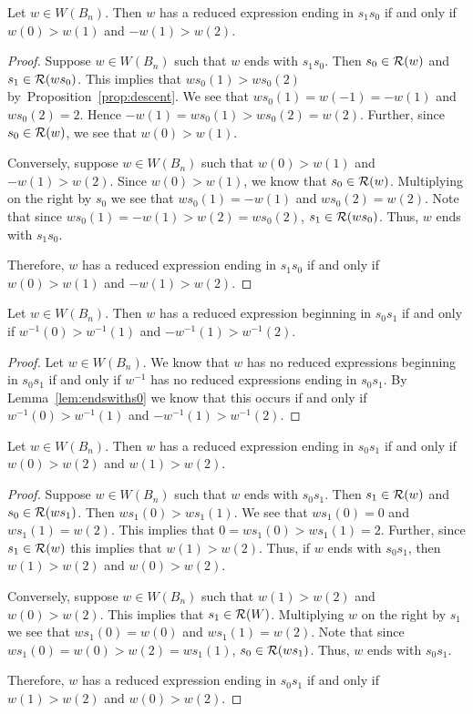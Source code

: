 \begin{lemma}\label{lem:endswiths0}
Let $w \in W(B_n)$. Then $w$ has a reduced expression ending in $s_1s_0$ if and only if $w(0)>w(1)$ and $-w(1)>w(2)$.
\begin{proof}
	Suppose $w \in W(B_n)$ such that $w$ ends with $s_1s_0$. Then $s_0 \in \mathcal{R}(w)$ and $s_1 \in \mathcal{R}(ws_0)$. This implies that $ws_0(1)>ws_0(2)$ by~Proposition~\ref{prop:descent}. We see that $ws_0(1)=w(-1)=-w(1)$ and $ws_0(2)=2$. Hence $-w(1)=ws_0(1)>ws_0(2)=w(2)$. Further, since $s_0 \in \mathcal{R}(w)$, we see that $w(0)>w(1)$.
	
	Conversely, suppose $w \in W(B_n)$ such that $w(0)>w(1)$ and $-w(1)>w(2)$. Since $w(0)>w(1)$, we know that $s_0 \in \mathcal{R}(w)$. Multiplying on the right by $s_0$ we see that $ws_0(1)=-w(1)$ and $ws_0(2)=w(2)$. Note that since $ws_0(1)=-w(1)>w(2)=ws_0(2)$, $s_1 \in \mathcal{R}(ws_0)$. Thus, $w$ ends with $s_1s_0$. 
	
	Therefore, $w$ has a reduced expression ending in $s_1s_0$ if and only if $w(0)>w(1)$ and $-w(1)>w(2)$.
\end{proof}
\end{lemma}

\begin{corollary}\label{lem:beginswiths0}
	Let $w \in W(B_n)$. Then $w$ has a reduced expression beginning in $s_0s_1$ if and only if $w^{-1}(0)>w^{-1}(1)$ and $-w^{-1}(1)>w^{-1}(2)$.
	\begin{proof}
		Let $w \in W(B_n)$. We know that $w$ has no reduced expressions beginning in $s_0s_1$ if and only if $w^{-1}$ has no reduced expressions ending in $s_0s_1$. By Lemma~\ref{lem:endswiths0} we know that this occurs if and only if $w^{-1}(0)>w^{-1}(1)$ and $-w^{-1}(1)>w^{-1}(2)$.
	\end{proof}
\end{corollary}

\begin{lemma}\label{lem:endswiths_1}
Let $w \in W(B_n)$. Then $w$ has a reduced expression ending in $s_0s_1$ if and only if $w(0)>w(2)$ and $w(1)>w(2)$.
\begin{proof}
	Suppose $w \in W(B_n)$ such that $w$ ends with $s_0s_1$. Then $s_1 \in \mathcal{R}(w)$ and $s_0 \in \mathcal{R}(ws_1)$. Then $ws_1(0)>ws_1(1)$. We see that $ws_1(0)=0$ and $ws_1(1)=w(2)$. This implies that $0=ws_1(0)>ws_1(1)=2$. Further, since $s_1 \in \mathcal{R}(w)$ this implies that $w(1) > w(2)$. Thus, if $w$ ends with $s_0s_1$, then $w(1)>w(2)$ and $w(0)>w(2)$.
	
	Conversely, suppose $w \in W(B_n)$ such that $w(1)>w(2)$ and $w(0)>w(2)$. This implies that $s_1 \in \mathcal{R}(W)$. Multiplying $w$ on the right by $s_1$ we see that $ws_1(0)=w(0)$ and $ws_1(1)=w(2)$. Note that since $ws_1(0)=w(0)>w(2)=ws_1(1)$, $s_0 \in \mathcal{R}(ws_1)$. Thus, $w$ ends with $s_0s_1$. 
	
	Therefore, $w$ has a reduced expression ending in $s_0s_1$ if and only if $w(1)>w(2)$ and $w(0)>w(2)$.
\end{proof}	
\end{lemma}


